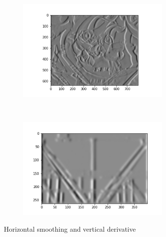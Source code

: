 \documentclass[
	12pt, %
]{fphw}
\begin{document}
\begin{figure}[h!]
    \centering
    \begin{subfigure}[t]{0.5\textwidth}
        \centering
        \includegraphics[height=2in]{img/1e/graf1.png}

    \end{subfigure}%
    ~ 
    \begin{subfigure}[t]{0.4\textwidth}
        \centering
        \includegraphics[height=2in]{img/1e/gantry1.png}

	\end{subfigure}
	\caption{Horizontal smoothing and vertical derivative}
\end{figure}
\end{document}
